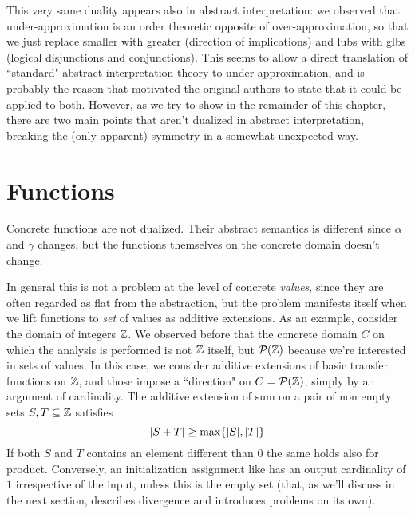 This very same duality appears also in abstract interpretation: we observed that under-approximation is an order theoretic opposite of over-approximation, so that we just replace smaller with greater (direction of implications) and lubs with glbs (logical disjunctions and conjunctions).
This seems to  allow a direct translation of ``standard" abstract interpretation theory to under-approximation, and is probably the reason that motivated the original authors to state that it could be applied to both. However, as we try to show in the remainder of this chapter, there are two main points that aren't dualized in abstract interpretation, breaking the (only apparent) symmetry in a somewhat unexpected way.

\section{Functions}
Concrete functions are not dualized. Their abstract semantics is different since $\alpha$ and $\gamma$ changes, but the functions themselves on the concrete domain doesn't change.

In general this is not a problem at the level of concrete \textit{values}, since they are often regarded as flat from the abstraction, but the problem manifests itself when we lift functions to \textit{set} of values as additive extensions.
As an example, consider the domain of integers $\mathbb{Z}$. We observed before that the concrete domain $C$ on which the analysis is performed is not $\mathbb{Z}$ itself, but $\mathcal{P}(\mathbb{Z})$ because we're interested in sets of values. In this case, we consider additive extensions of basic transfer functions on $\mathbb{Z}$, and those impose a ``direction" on $C = \mathcal{P}(\mathbb{Z})$, simply by an argument of cardinality.
The additive extension of sum on a pair of non empty sets $S, T \subseteq \mathbb{Z}$ satisfies
\[
\lvert S + T\rvert \ge \max\{ \lvert S\rvert, \lvert T\rvert \}
\]
If both $S$ and $T$ contains an element different than $0$ the same holds also for product.
Conversely, an initialization assignment like  has an output cardinality of $1$ irrespective of the input, unless this is the empty set (that, as we'll discuss in the next section, describes divergence and introduces problems on its own).

